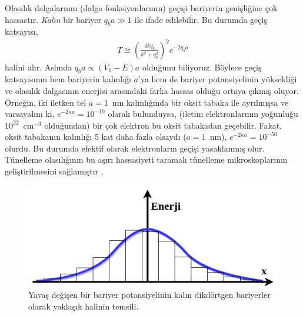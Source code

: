 \documentclass[a4paper,12pt, twoside]{article}
\begin{document}
Olasılık dalgalarının (dalga fonksiyonlarının) geçişi bariyerin genişliğine çok hassastır. 
\emph{Kalın} bir bariyer $q_b a \gg 1$ ile ifade edilebilir. Bu durumda geçiş katsayısı, 
\begin{align}
T \cong\left(\frac{4 k q_b}{k^{2}+q_b^{2}}\right)^{2} e^{-2 q_b a}
\label{eq:kalinBariyer}
\end{align}
halini alır. Aslında $q_b a \varpropto (V_0-E) a$ olduğunu biliyoruz. Böylece geçiş katsayısının hem bariyerin kalınlığı $a$'ya hem de bariyer potansiyelinin yüksekliği ve olasılık dalgasının enerjisi arasındaki farka hassas olduğu ortaya çıkmış oluyor. Örneğin, iki iletken tel $a = 1$~nm kalınlığında bir oksit tabaka ile ayrılmışsa ve varsayalım ki, $e^{-2 \kappa a}=10^{-10}$ olarak bulunduysa, (iletim elektronlarının yoğunluğu $10^{22}$~cm$^{-3}$ olduğundan) bir çok elektron bu oksit tabakadan geçebilir. Fakat, oksit tabakanın kalınlığı 5 kat daha fazla olsaydı ($a = 1$~nm), $e^{-2 \kappa a}=10^{-50}$ olurdu. Bu durumda efektif olarak elektronların geçişi yasaklanmış olur. Tünelleme olasılığının bu aşırı hassasiyeti taramalı tünelleme mikroskoplarının geliştirilmesini sağlamıştır \cite{book:Towsend}.

\begin{figure}[!hbtp]
		\centering
		\includegraphics[width=.7\linewidth]{figurler/WKB_Bariyer_Potansiyeli.png}
		\caption{Yavaş değişen bir bariyer potansiyelinin kalın dikdörtgen bariyerler olarak yaklaşık halinin temsili.
		}
		\label{fig:yumusak_bariyerpot}
\end{figure}
\end{document}
